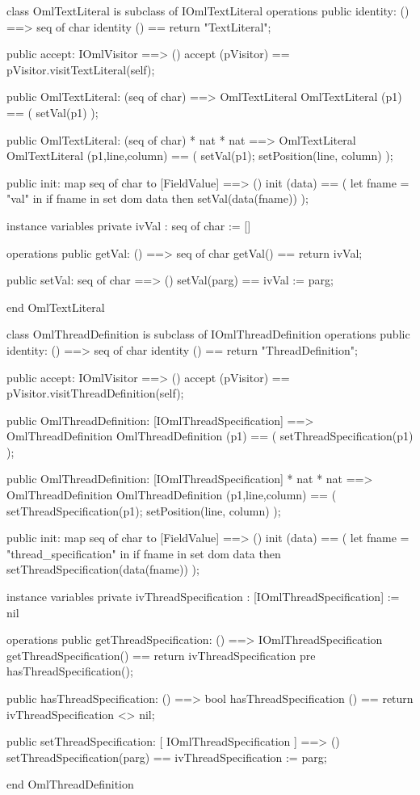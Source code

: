 \begin{vdm_al}
class OmlTextLiteral is subclass of IOmlTextLiteral
operations
  public identity: () ==> seq of char
  identity () == return "TextLiteral";

  public accept: IOmlVisitor ==> ()
  accept (pVisitor) == pVisitor.visitTextLiteral(self);

  public OmlTextLiteral:
    (seq of char) ==> OmlTextLiteral
  OmlTextLiteral (p1) == 
    ( setVal(p1) );

  public OmlTextLiteral:
    (seq of char) *
    nat *
    nat ==> OmlTextLiteral
  OmlTextLiteral (p1,line,column) == 
    ( setVal(p1);
      setPosition(line, column) );

  public init: map seq of char to [FieldValue] ==> ()
  init (data) ==
    ( let fname = "val" in
        if fname in set dom data
        then setVal(data(fname)) );

instance variables
  private ivVal : seq of char := []

operations
  public getVal: () ==> seq of char
  getVal() == return ivVal;

  public setVal: seq of char ==> ()
  setVal(parg) == ivVal := parg;

end OmlTextLiteral
\end{vdm_al}

\begin{vdm_al}
class OmlThreadDefinition is subclass of IOmlThreadDefinition
operations
  public identity: () ==> seq of char
  identity () == return "ThreadDefinition";

  public accept: IOmlVisitor ==> ()
  accept (pVisitor) == pVisitor.visitThreadDefinition(self);

  public OmlThreadDefinition:
    [IOmlThreadSpecification] ==> OmlThreadDefinition
  OmlThreadDefinition (p1) == 
    ( setThreadSpecification(p1) );

  public OmlThreadDefinition:
    [IOmlThreadSpecification] *
    nat *
    nat ==> OmlThreadDefinition
  OmlThreadDefinition (p1,line,column) == 
    ( setThreadSpecification(p1);
      setPosition(line, column) );

  public init: map seq of char to [FieldValue] ==> ()
  init (data) ==
    ( let fname = "thread_specification" in
        if fname in set dom data
        then setThreadSpecification(data(fname)) );

instance variables
  private ivThreadSpecification : [IOmlThreadSpecification] := nil

operations
  public getThreadSpecification: () ==> IOmlThreadSpecification
  getThreadSpecification() == return ivThreadSpecification
    pre hasThreadSpecification();

  public hasThreadSpecification: () ==> bool
  hasThreadSpecification () == return ivThreadSpecification <> nil;

  public setThreadSpecification: [ IOmlThreadSpecification ] ==> ()
  setThreadSpecification(parg) == ivThreadSpecification := parg;

end OmlThreadDefinition
\end{vdm_al}

